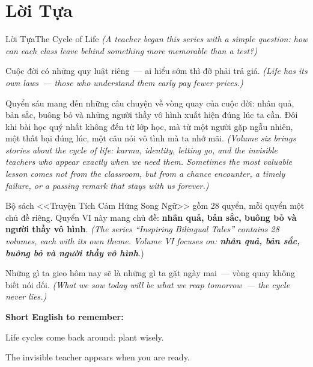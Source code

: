 \chapter*{Lời Tựa}

\begin{truyen}{Lời Tựa}{The Cycle of Life}
\textit{(A teacher began this series with a simple question: how can each class leave behind something more memorable than a test?)}

Cuộc đời có những quy luật riêng~--- ai hiểu sớm thì đỡ phải trả giá.
\textit{(Life has its own laws~--- those who understand them early pay fewer prices.)}

Quyển sáu mang đến những câu chuyện về vòng quay của cuộc đời: nhân quả, bản sắc, buông bỏ và những người thầy vô hình xuất hiện đúng lúc ta cần. Đôi khi bài học quý nhất không đến từ lớp học, mà từ một người gặp ngẫu nhiên, một thất bại đúng lúc, một câu nói vô tình mà ta nhớ mãi.
\textit{(Volume six brings stories about the cycle of life: karma, identity, letting go, and the invisible teachers who appear exactly when we need them. Sometimes the most valuable lesson comes not from the classroom, but from a chance encounter, a timely failure, or a passing remark that stays with us forever.)}

Bộ sách <<Truyện Tích Cảm Hứng Song Ngữ>> gồm 28 quyển, mỗi quyển một chủ đề riêng. Quyển VI này mang chủ đề: \textbf{nhân quả, bản sắc, buông bỏ và người thầy vô hình}.
\textit{(The series ``Inspiring Bilingual Tales'' contains 28 volumes, each with its own theme. Volume VI focuses on: \textbf{nhân quả, bản sắc, buông bỏ và người thầy vô hình}.})
\end{truyen}

\begin{baihoc}
Những gì ta gieo hôm nay sẽ là những gì ta gặt ngày mai~--- vòng quay không biết nói dối.
\textit{(What we sow today will be what we reap tomorrow~--- the cycle never lies.)}
\end{baihoc}

\begin{tcolorbox}[
  colback=truyenblue!6, colframe=truyenblue,
  coltitle=white, fonttitle=\bfseries,
  title={Easy English},
  arc=4pt, boxrule=1pt, breakable, enhanced
]
\textbf{Short English to remember:}

Life cycles come back around: plant wisely.

The invisible teacher appears when you are ready.
\end{tcolorbox}


